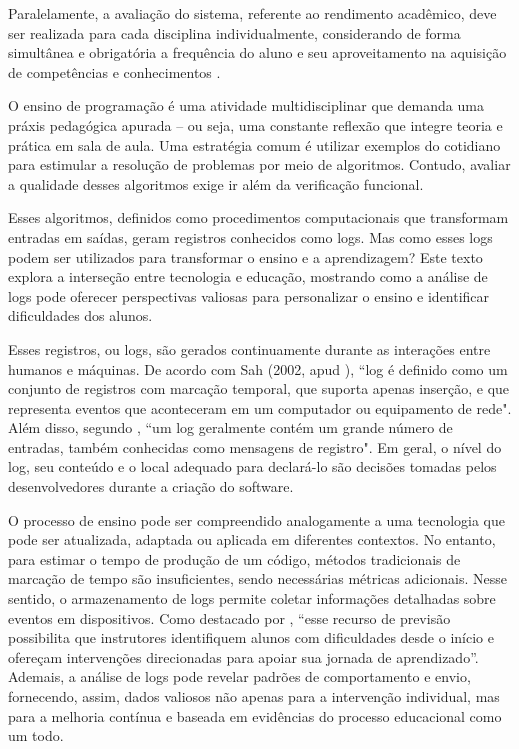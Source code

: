Paralelamente, a avaliação do sistema, referente ao rendimento acadêmico, deve ser realizada para cada disciplina individualmente, considerando de forma simultânea e obrigatória a frequência do aluno e seu aproveitamento na aquisição de competências e conhecimentos \cite{IFAM2020}.

O ensino de programação é uma atividade multidisciplinar que demanda uma práxis pedagógica apurada -- ou seja, 
uma constante reflexão que integre teoria e prática em sala de aula. Uma estratégia comum é utilizar exemplos 
do cotidiano para estimular a resolução de problemas por meio de algoritmos. Contudo, avaliar a qualidade  
desses algoritmos exige ir além da verificação funcional. 

Esses algoritmos, definidos como procedimentos computacionais que transformam entradas em saídas, geram 
registros conhecidos como logs. Mas como esses logs podem ser utilizados para transformar o ensino e a 
aprendizagem? Este texto explora a interseção entre tecnologia e educação, mostrando como a análise de logs 
pode oferecer perspectivas valiosas para personalizar o ensino e identificar dificuldades dos alunos.

Esses registros, ou logs, são gerados continuamente durante as interações entre humanos e máquinas. De acordo 
com Sah (2002, apud \cite{clemente2008arquitetura}), ``log é definido como um conjunto de registros com 
marcação temporal, que suporta apenas inserção, e que representa eventos que aconteceram em um computador ou 
equipamento de rede". Além disso, segundo \cite{gu2022logging}, ``um log geralmente contém um grande número de 
entradas, também conhecidas como mensagens de registro". Em geral, o nível do log, seu conteúdo e o local 
adequado para declará-lo são decisões tomadas pelos desenvolvedores durante a criação do software.

O processo de ensino pode ser compreendido analogamente a uma tecnologia que pode ser atualizada, adaptada ou 
aplicada em diferentes contextos. No entanto, para estimar o tempo de produção de um código, métodos 
tradicionais de marcação de tempo são insuficientes, sendo necessárias métricas adicionais. Nesse sentido, o 
armazenamento de logs permite coletar informações detalhadas sobre eventos em dispositivos. Como destacado por 
\cite{nguyen_analyzing_2023}, ``esse recurso de previsão possibilita que instrutores identifiquem alunos com 
dificuldades desde o início e ofereçam intervenções direcionadas para apoiar sua jornada de aprendizado''. 
Ademais, a análise de logs pode revelar padrões de comportamento e envio, fornecendo, assim,  dados valiosos 
não apenas para a intervenção individual, mas para a melhoria contínua  e baseada em evidências do processo 
educacional como um todo.


